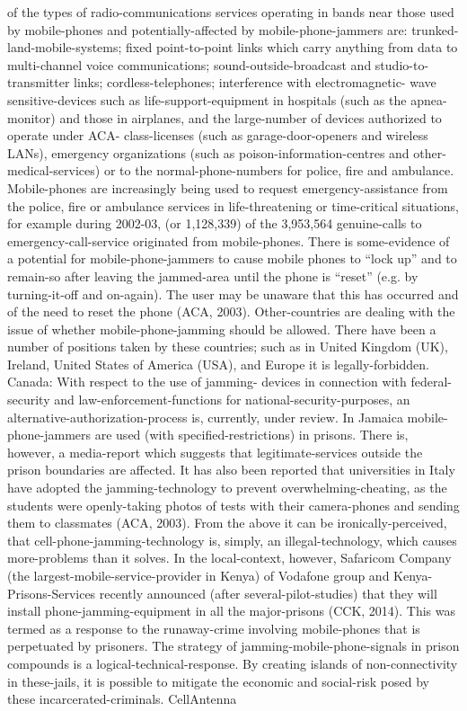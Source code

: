 \documentclass{article}
\begin{document}
of  the  types  of  radio-communications services operating in bands near those used by mobile-phones and potentially-affected by mobile-phone-jammers are:  trunked-land-mobile-systems;  fixed point-to-point  links which  carry  anything  from  data  to  multi-channel voice  communications;  sound-outside-broadcast  and  studio-to-transmitter  links;  cordless-telephones; interference  with  electromagnetic-  wave  sensitive-devices  such as  life-support-equipment  in  hospitals  (such  as the apnea-monitor) and those  in airplanes,   and  the  large-number  of devices authorized to operate  under  ACA- class-licenses  (such  as  garage-door-openers  and  wireless  LANs),  emergency  organizations  (such  as  poison-information-centres and other-medical-services) or to the normal-phone-numbers for police, fire and ambulance. Mobile-phones are  increasingly  being  used to request emergency-assistance  from the police, fire  or  ambulance services  in  life-threatening or  time-critical  situations,  for example  during  2002-03,  (or  1,128,339) of  the 3,953,564 genuine-calls to emergency-call-service originated from mobile-phones. There is some-evidence of a potential  for  mobile-phone-jammers  to cause  mobile  phones  to  “lock  up”  and  to  remain-so  after  leaving  the jammed-area until the phone is “reset”  (e.g.  by turning-it-off  and  on-again).  The user  may  be  unaware  that this has occurred and of the need to reset the phone (ACA, 2003). Other-countries are dealing with the issue of whether mobile-phone-jamming should be allowed. There have  been  a number of  positions  taken  by  these  countries;  such  as  in United  Kingdom  (UK),  Ireland,  United States  of  America  (USA),  and  Europe  it  is legally-forbidden.  Canada:  With respect  to  the  use of  jamming- devices  in  connection  with  federal-security  and  law-enforcement-functions  for  national-security-purposes,  an alternative-authorization-process  is,  currently,  under review.  In  Jamaica mobile-phone-jammers  are  used  (with specified-restrictions)  in  prisons.  There  is,  however,  a  media-report  which  suggests  that  legitimate-services outside the prison  boundaries are  affected.  It has  also  been reported  that  universities in  Italy  have  adopted  the jamming-technology to prevent overwhelming-cheating, as  the students were openly-taking photos of tests with their camera-phones and sending them to classmates (ACA, 2003).  From  the  above  it  can  be  ironically-perceived,  that  cell-phone-jamming-technology  is,  simply,  an illegal-technology,  which  causes  more-problems  than  it  solves.  In  the  local-context,  however,  Safaricom Company  (the  largest-mobile-service-provider  in  Kenya)  of  Vodafone  group  and  Kenya-Prisons-Services recently announced (after several-pilot-studies) that they will install phone-jamming-equipment in all the major-prisons  (CCK,  2014).  This  was  termed  as  a  response  to  the  runaway-crime  involving  mobile-phones  that  is perpetuated by prisoners.  The strategy of jamming-mobile-phone-signals in prison compounds is a logical-technical-response. By creating islands of non-connectivity in these-jails, it is possible to mitigate the economic and social-risk posed by these  incarcerated-criminals.  CellAntenna  
\end{document}
